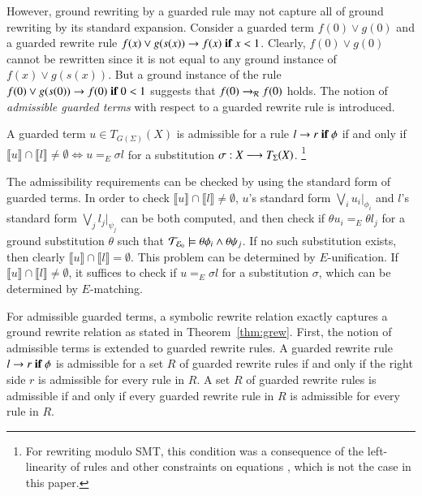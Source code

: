 However, ground rewriting by a guarded rule may not capture all of
ground rewriting by its standard expansion.
%
Consider a guarded term $f(0) \vee g(0)$ and a guarded rewrite rule
$f(x) \vee g(s(x)) \rightarrow f(x)\;\textnormal{\bf if}\; {x < 1}$.  Clearly, $f(0) \vee g(0)$
cannot be rewritten since it is not equal to any ground instance of
$f(x) \vee g(s(x))$.  But a ground instance of the rule $f(0)
  \vee g(s(0)) \rightarrow f(0)\;\textnormal{\bf if}\; {0 < 1}$ suggests that $f(0) \to_{\mathcal{R}} f(0)$ holds.
The notion of \emph{admissible guarded terms} with respect to a
guarded rewrite rule is introduced.

\begin{definition}
A guarded term $u \in T_{G(\Sigma)}(X)$ is admissible for a rule
$l \rightarrow r\;\textnormal{\bf if}\; {\phi}$ if and only if $\llbracket u \rrbracket \cap
\llbracket l \rrbracket \neq \emptyset \iff u =_E \sigma l$ for a
substitution $\sigma : X \longrightarrow T_\Sigma(X)$.
\footnote{For rewriting modulo SMT, this condition was a consequence
  of the left-linearity of rules and other constraints on equations
  \cite{rocha-rewsmtjlamp-2017}, which is not the case in this paper.}
\end{definition}

The admissibility requirements can be checked by using the standard
form of guarded terms.  In order to check $\llbracket u \rrbracket
\cap \llbracket l \rrbracket \neq \emptyset$, $u$'s standard form
$\bigvee_i u_i |_{\phi_i}$ and $l$'s standard form $\bigvee_j l_j
|_{\psi_j}$ can be both computed, and then check if $\theta u_i =_E
\theta l_j$ for a ground substitution $\theta$ such that $\mathcal{T}_{\mathcal{E}_{0}}
\models \theta \phi_i \wedge \theta \psi_j$.  If no such substitution
exists, then clearly $\llbracket u \rrbracket \cap \llbracket l
\rrbracket = \emptyset$.  This problem can be determined by
$E$-unification.  If $\llbracket u \rrbracket \cap \llbracket l
\rrbracket \neq \emptyset$, it suffices to check if $u =_E \sigma l$
for a substitution $\sigma$, which can be determined by $E$-matching.

For admissible guarded terms, a symbolic rewrite relation exactly
captures a ground rewrite relation as stated in
Theorem~\ref{thm:grew}.  First, the notion of admissible terms is
extended to guarded rewrite rules.  A guarded rewrite rule
$l \rightarrow r\;\textnormal{\bf if}\; {\phi}$ is admissible for a set $R$ of guarded rewrite
rules if and only if the right side $r$ is admissible for every rule
in $R$.  A set $R$ of guarded rewrite rules is admissible if and only
if every guarded rewrite rule in $R$ is admissible for every rule in
$R$.



